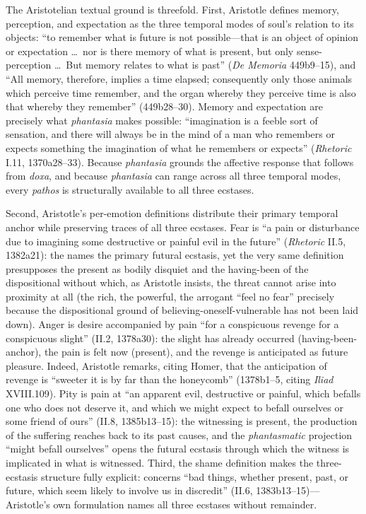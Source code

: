 The Aristotelian textual ground is threefold. First, Aristotle defines memory, perception, and expectation as the three temporal modes of soul's relation to its objects: ``to remember what is future is not possible---that is an object of opinion or expectation \ldots\ nor is there memory of what is present, but only sense-perception \ldots\ But memory relates to what is past'' (\textit{De Memoria} 449b9--15), and ``All memory, therefore, implies a time elapsed; consequently only those animals which perceive time remember, and the organ whereby they perceive time is also that whereby they remember'' (449b28--30). Memory and expectation are precisely what \textit{phantasia} makes possible: ``imagination is a feeble sort of sensation, and there will always be in the mind of a man who remembers or expects something the imagination of what he remembers or expects'' (\textit{Rhetoric} I.11, 1370a28--33). Because \textit{phantasia} grounds the affective response that follows from \textit{doxa}, and because \textit{phantasia} can range across all three temporal modes, every \textit{pathos} is structurally available to all three ecstases.

Second, Aristotle's per-emotion definitions distribute their primary temporal anchor while preserving traces of all three ecstases. Fear is ``a pain or disturbance due to imagining some destructive or painful evil in the future'' (\textit{Rhetoric} II.5, 1382a21): the  names the primary futural ecstasis, yet the very same definition presupposes the present  as bodily disquiet and the having-been of the dispositional  without which, as Aristotle insists, the threat cannot arise into proximity at all (the rich, the powerful, the arrogant ``feel no fear'' precisely because the dispositional ground of believing-oneself-vulnerable has not been laid down). Anger is desire accompanied by pain ``for a conspicuous revenge for a conspicuous slight'' (II.2, 1378a30): the slight has already occurred (having-been-anchor), the pain is felt now (present), and the revenge is anticipated as future pleasure. Indeed, Aristotle remarks, citing Homer, that the anticipation of revenge is ``sweeter it is by far than the honeycomb'' (1378b1--5, citing \textit{Iliad} XVIII.109). Pity is pain at ``an apparent evil, destructive or painful, which befalls one who does not deserve it, and which we might expect to befall ourselves or some friend of ours'' (II.8, 1385b13--15): the witnessing is present, the production of the suffering reaches back to its past causes, and the \textit{phantasmatic} projection ``might befall ourselves'' opens the futural ecstasis through which the witness is implicated in what is witnessed. Third, the shame definition makes the three-ecstasis structure fully explicit:  concerns ``bad things, whether present, past, or future, which seem likely to involve us in discredit'' (II.6, 1383b13--15)---Aristotle's own formulation names all three ecstases without remainder.

